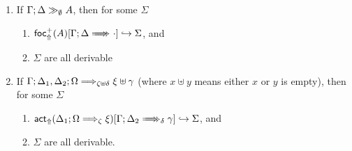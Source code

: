 \begin{lemma}\label{completeness-lemma}
  \begin{enumerate}

  \item If $\Gamma; \Delta \gg_{\emptyset} A$, then for some $\Sigma$
    \begin{enumerate}
    \item $\relj{\brfrel{A}}{\zbneuseq{\Gamma}{\Delta}{}{\cdot}}{\Sigma}$, and
    \item $\Sigma$ are all derivable
    \end{enumerate}

  \item If $\Gamma; \Delta_1, \Delta_2; \Omega \Longrightarrow_{\zeta \uplus \delta} \xi \uplus
      \gamma$ (where $x \uplus y$ means either $x$ or $y$ is
    empty), then for some $\Sigma$
    \begin{enumerate}
    \item
      $\bactrelj{\zsyseq{\Delta_1}{\Omega}{\zeta}{\xi}}
      {\zbneuseq{\Gamma}{\Delta_2}{\delta}{\gamma}}{\Sigma}$,
      and
    \item $\Sigma$ are all derivable.
    \end{enumerate}
  \end{enumerate}
\end{lemma}
